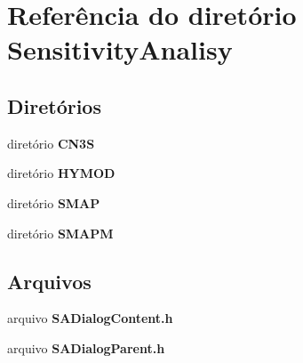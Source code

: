 \section{Referência do diretório Sensitivity\+Analisy}
\label{dir_9f8a8d8620de15c23b5d6c200b943fab}
\subsection*{Diretórios}
\begin{DoxyCompactItemize}
\item 
diretório {\bf C\+N3S}
\item 
diretório {\bf H\+Y\+M\+OD}
\item 
diretório {\bf S\+M\+AP}
\item 
diretório {\bf S\+M\+A\+PM}
\end{DoxyCompactItemize}
\subsection*{Arquivos}
\begin{DoxyCompactItemize}
\item 
arquivo {\bf S\+A\+Dialog\+Content.\+h}
\item 
arquivo {\bf S\+A\+Dialog\+Parent.\+h}
\end{DoxyCompactItemize}
